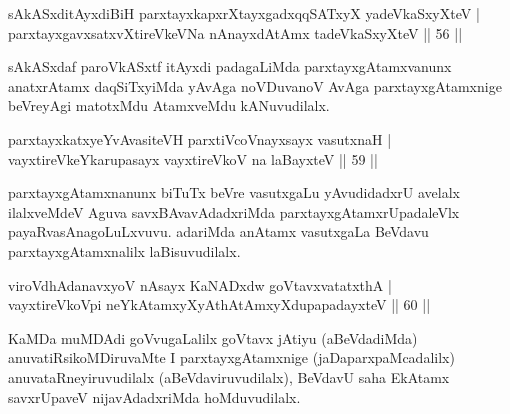 \begin{shl}
sAkASxditAyxdiBiH parxtayxkapxrXtayxgadxqqSATxyX yadeVkaSxyXteV |\\
parxtayxgavxsatxvXtireVkeVNa nAnayxdAtAmx tadeVkaSxyXteV \hfill || 56 ||
\end{shl}

\begin{artha}
sAkASxdaf paroVkASxtf itAyxdi padagaLiMda parxtayxgAtamxvanunx anatxrAtamx daqSiTxyiMda yAvAga noVDuvanoV AvAga parxtayxgAtamxnige beVreyAgi matotxMdu AtamxveMdu kANuvudilalx.
\end{artha}



\begin{shl}
parxtayxkatxyeYvAvasiteVH parxtiVcoV\s nayxsayx vasutxnaH |\\
vayxtireVkeYkarupasayx vayxtireVkoV na laBayxteV \hfill || 59 ||
\end{shl}

\begin{artha}%
parxtayxgAtamxnanunx biTuTx beVre vasutxgaLu yAvudidadxrU avelalx ilalxveMdeV Aguva savxBAvavAdadxriMda  parxtayxgAtamxrUpadaleVlx payaRvasAnagoLuLxvuvu. adariMda anAtamx vasutxgaLa BeVdavu parxtayxgAtamxnalilx laBisuvudilalx.
\end{artha}

\begin{shl}
viroVdhAdanavxyoV nAsayx KaNADxdw goVtavxvatatxthA |\\
vayxtireVkoV\s pi neYkAtamxyXyAthAtAmxyXdupapadayxteV \hfill || 60 ||
\end{shl}

\begin{artha}
KaMDa muMDAdi goVvugaLalilx goVtavx jAtiyu (aBeVdadiMda) anuvatiRsikoMDiruvaMte I parxtayxgAtamxnige (jaDaparxpaMcadalilx) anuvataRneyiruvudilalx  (aBeVdaviruvudilalx), BeVdavU saha EkAtamx savxrUpaveV nijavAdadxriMda hoMduvudilalx.
\end{artha}


